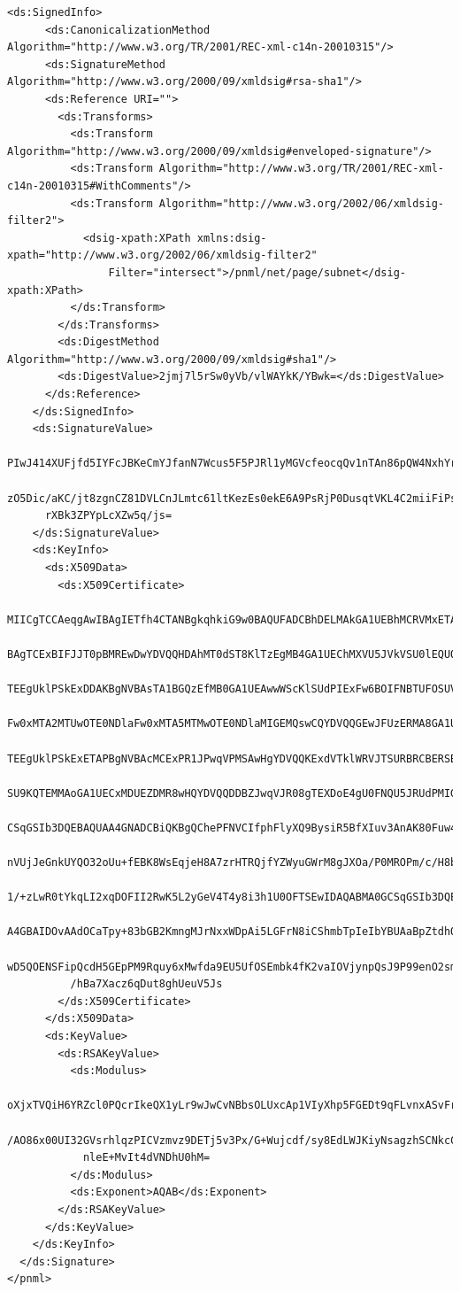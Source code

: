 \begin{lstlisting}[basicstyle=\ttfamily\tiny]
    <ds:SignedInfo>
      <ds:CanonicalizationMethod Algorithm="http://www.w3.org/TR/2001/REC-xml-c14n-20010315"/>
      <ds:SignatureMethod Algorithm="http://www.w3.org/2000/09/xmldsig#rsa-sha1"/>
      <ds:Reference URI="">
        <ds:Transforms>
          <ds:Transform Algorithm="http://www.w3.org/2000/09/xmldsig#enveloped-signature"/>
          <ds:Transform Algorithm="http://www.w3.org/TR/2001/REC-xml-c14n-20010315#WithComments"/>
          <ds:Transform Algorithm="http://www.w3.org/2002/06/xmldsig-filter2">
            <dsig-xpath:XPath xmlns:dsig-xpath="http://www.w3.org/2002/06/xmldsig-filter2"
                Filter="intersect">/pnml/net/page/subnet</dsig-xpath:XPath>
          </ds:Transform>
        </ds:Transforms>
        <ds:DigestMethod Algorithm="http://www.w3.org/2000/09/xmldsig#sha1"/>
        <ds:DigestValue>2jmj7l5rSw0yVb/vlWAYkK/YBwk=</ds:DigestValue>
      </ds:Reference>
    </ds:SignedInfo>
    <ds:SignatureValue>
      PIwJ414XUFjfd5IYFcJBKeCmYJfanN7Wcus5F5PJRl1yMGVcfeocqQv1nTAn86pQW4NxhYrXEEnD
      zO5Dic/aKC/jt8zgnCZ81DVLCnJLmtc61ltKezEs0ekE6A9PsRjP0DusqtVKL4C2miiFiPsL3enn
      rXBk3ZPYpLcXZw5q/js=
    </ds:SignatureValue>
    <ds:KeyInfo>
      <ds:X509Data>
        <ds:X509Certificate>
          MIICgTCCAeqgAwIBAgIETfh4CTANBgkqhkiG9w0BAQUFADCBhDELMAkGA1UEBhMCRVMxETAPBgNV
          BAgTCExBIFJJT0pBMREwDwYDVQQHDAhMT0dST8KlTzEgMB4GA1UEChMXVU5JVkVSU0lEQUQgREUg
          TEEgUklPSkExDDAKBgNVBAsTA1BGQzEfMB0GA1UEAwwWScKlSUdPIExFw6BOIFNBTUFOSUVHTzAe
          Fw0xMTA2MTUwOTE0NDlaFw0xMTA5MTMwOTE0NDlaMIGEMQswCQYDVQQGEwJFUzERMA8GA1UECBMI
          TEEgUklPSkExETAPBgNVBAcMCExPR1JPwqVPMSAwHgYDVQQKExdVTklWRVJTSURBRCBERSBMQSBS
          SU9KQTEMMAoGA1UECxMDUEZDMR8wHQYDVQQDDBZJwqVJR08gTEXDoE4gU0FNQU5JRUdPMIGfMA0G
          CSqGSIb3DQEBAQUAA4GNADCBiQKBgQChePFNVCIfphFlyXQ9BysiR5BfXIuv3AnAK80Fuw4tTFwC
          nVUjJeGnkUYQO32oUu+fEBK8WsEqjeH8A7zrHTRQjfYZWyuGWrM8gJXOa/P0MROPm/c/H8b5a6Nx
          1/+zLwR0tYkqLI2xqDOFII2RwK5L2yGeV4T4y8i3h1U0OFTSEwIDAQABMA0GCSqGSIb3DQEBBQUA
          A4GBAIDOvAAdOCaTpy+83bGB2KmngMJrNxxWDpAi5LGFrN8iCShmbTpIeIbYBUAaBpZtdhOnhq4n
          wD5QOENSFipQcdH5GEpPM9Rquy6xMwfda9EU5UfOSEmbk4fK2vaIOVjynpQsJ9P99enO2smQlyvw
          /hBa7Xacz6qDut8ghUeuV5Js
        </ds:X509Certificate>
      </ds:X509Data>
      <ds:KeyValue>
        <ds:RSAKeyValue>
          <ds:Modulus>
            oXjxTVQiH6YRZcl0PQcrIkeQX1yLr9wJwCvNBbsOLUxcAp1VIyXhp5FGEDt9qFLvnxASvFrBKo3h
            /AO86x00UI32GVsrhlqzPICVzmvz9DETj5v3Px/G+Wujcdf/sy8EdLWJKiyNsagzhSCNkcCuS9sh
            nleE+MvIt4dVNDhU0hM=
          </ds:Modulus>
          <ds:Exponent>AQAB</ds:Exponent>
        </ds:RSAKeyValue>
      </ds:KeyValue>
    </ds:KeyInfo>
  </ds:Signature>
</pnml>
\end{lstlisting}



